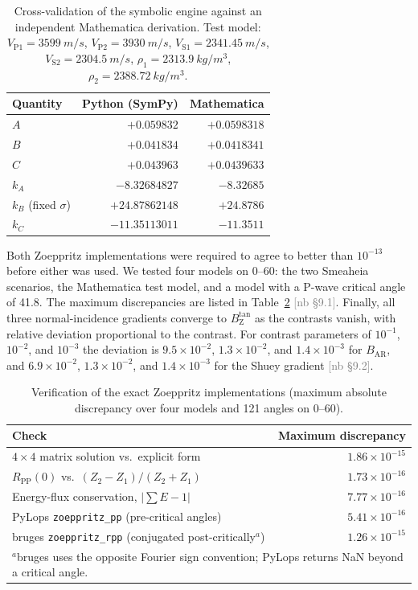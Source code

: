 \documentclass[11pt]{article}
\newcommand{\RPP}{R_\mathrm{PP}}
\newcommand{\Btan}{B_\mathrm{Z}^{\tan}}
\newcommand{\BAR}{B_\mathrm{AR}}
\newif\ifshownb \shownbtrue
\newcommand{\nb}[1]{\ifshownb\textcolor{gray}{[nb #1]}\fi}
\begin{document}
\begin{table}[htbp]
\centering
\caption{Cross-validation of the symbolic engine against an independent Mathematica derivation. Test model: $V_{\mathrm{P}1}=\SI{3599}{m/s}$, $V_{\mathrm{P}2}=\SI{3930}{m/s}$, $V_{\mathrm{S}1}=\SI{2341.45}{m/s}$, $V_{\mathrm{S}2}=\SI{2304.5}{m/s}$, $\rho_1=\SI{2313.9}{kg/m^3}$, $\rho_2=\SI{2388.72}{kg/m^3}$.}
\label{tab:mma}
\begin{tabular}{lrr}
\toprule
Quantity & Python (SymPy) & Mathematica \\
\midrule
$A$   & $+0.059832$ & $+0.0598318$ \\
$B$   & $+0.041834$ & $+0.0418341$ \\
$C$   & $+0.043963$ & $+0.0439633$ \\
$k_A$ & $-8.32684827$ & $-8.32685$ \\
$k_B$ (fixed $\sigma$) & $+24.87862148$ & $+24.8786$ \\
$k_C$ & $-11.35113011$ & $-11.3511$ \\
\bottomrule
\end{tabular}
\end{table}

Both Zoeppritz implementations were required to agree to better than $10^{-13}$ before either was used. We tested four models on 0\textdegree--60\textdegree: the two Smeaheia scenarios, the Mathematica test model, and a model with a P-wave critical angle of 41.8\textdegree. The maximum discrepancies are listed in Table~\ref{tab:zoep} \nb{\S9.1}. Finally, all three normal-incidence gradients converge to $\Btan$ as the contrasts vanish, with relative deviation proportional to the contrast. For contrast parameters of $10^{-1}$, $10^{-2}$, and $10^{-3}$ the deviation is $9.5\times10^{-2}$, $1.3\times10^{-2}$, and $1.4\times10^{-3}$ for $\BAR$, and $6.9\times10^{-2}$, $1.3\times10^{-2}$, and $1.4\times10^{-3}$ for the Shuey gradient \nb{\S9.2}.

\begin{table}[htbp]
\centering
\caption{Verification of the exact Zoeppritz implementations (maximum absolute discrepancy over four models and 121 angles on 0\textdegree--60\textdegree).}
\label{tab:zoep}
\begin{tabular}{lr}
\toprule
Check & Maximum discrepancy \\
\midrule
$4\times4$ matrix solution vs.\ explicit \citet{aki1980} form & $1.86\times10^{-15}$ \\
$\RPP(0)$ vs.\ $(Z_2-Z_1)/(Z_2+Z_1)$ & $1.73\times10^{-16}$ \\
Energy-flux conservation, $|\sum E-1|$ & $7.77\times10^{-16}$ \\
PyLops \texttt{zoeppritz\_pp} (pre-critical angles) & $5.41\times10^{-16}$ \\
bruges \texttt{zoeppritz\_rpp} (conjugated post-critically$^{a}$) & $1.26\times10^{-15}$ \\
\bottomrule
\multicolumn{2}{l}{\footnotesize $^{a}$bruges uses the opposite Fourier sign convention; PyLops returns NaN beyond a critical angle.}
\end{tabular}
\end{table}
\end{document}
